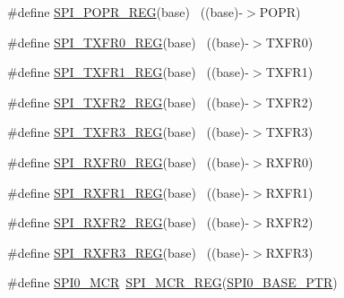 \begin{DoxyCompactItemize}
\item 
\#define \hyperlink{group___s_p_i___register___accessor___macros_ga57ef11c450e1a45e272be2849083977b}{S\+P\+I\+\_\+\+P\+O\+P\+R\+\_\+\+R\+EG}(base)                                          ~((base)-\/$>$P\+O\+PR)
\item 
\#define \hyperlink{group___s_p_i___register___accessor___macros_ga71b7e1c40b7f2d11e956b9814be20261}{S\+P\+I\+\_\+\+T\+X\+F\+R0\+\_\+\+R\+EG}(base)                                        ~((base)-\/$>$T\+X\+F\+R0)
\item 
\#define \hyperlink{group___s_p_i___register___accessor___macros_ga9011fe0adbd2dce8076c23bbe8aef929}{S\+P\+I\+\_\+\+T\+X\+F\+R1\+\_\+\+R\+EG}(base)                                        ~((base)-\/$>$T\+X\+F\+R1)
\item 
\#define \hyperlink{group___s_p_i___register___accessor___macros_ga54c1e67e69fb1a8b1baef7a520df5e39}{S\+P\+I\+\_\+\+T\+X\+F\+R2\+\_\+\+R\+EG}(base)                                        ~((base)-\/$>$T\+X\+F\+R2)
\item 
\#define \hyperlink{group___s_p_i___register___accessor___macros_gac353c1ece16b5024b887c728cbe32d34}{S\+P\+I\+\_\+\+T\+X\+F\+R3\+\_\+\+R\+EG}(base)                                        ~((base)-\/$>$T\+X\+F\+R3)
\item 
\#define \hyperlink{group___s_p_i___register___accessor___macros_ga0f6e212d734b440c0b7e16d3389a6687}{S\+P\+I\+\_\+\+R\+X\+F\+R0\+\_\+\+R\+EG}(base)                                        ~((base)-\/$>$R\+X\+F\+R0)
\item 
\#define \hyperlink{group___s_p_i___register___accessor___macros_gacf895cbc35557f8f25eff12d7e84d582}{S\+P\+I\+\_\+\+R\+X\+F\+R1\+\_\+\+R\+EG}(base)                                        ~((base)-\/$>$R\+X\+F\+R1)
\item 
\#define \hyperlink{group___s_p_i___register___accessor___macros_ga23c02a896d81445dbdea2e8d0d490b0a}{S\+P\+I\+\_\+\+R\+X\+F\+R2\+\_\+\+R\+EG}(base)                                        ~((base)-\/$>$R\+X\+F\+R2)
\item 
\#define \hyperlink{group___s_p_i___register___accessor___macros_ga2419cd7143d831f0a31ac7bda0da7af7}{S\+P\+I\+\_\+\+R\+X\+F\+R3\+\_\+\+R\+EG}(base)                                        ~((base)-\/$>$R\+X\+F\+R3)
\item 
\#define \hyperlink{group___s_p_i___register___accessor___macros_gaad4d9e80de527e18ba0e9d5d2bb296f1}{S\+P\+I0\+\_\+\+M\+CR}~\hyperlink{group___s_p_i___register___accessor___macros_gae54fdee07e5ec098efe6da63f34f2ecd}{S\+P\+I\+\_\+\+M\+C\+R\+\_\+\+R\+EG}(\hyperlink{group___s_p_i___peripheral_ga851f64a97b5919c1f99a34db5918b3b4}{S\+P\+I0\+\_\+\+B\+A\+S\+E\+\_\+\+P\+TR})

\end{DoxyCompactItemize}
